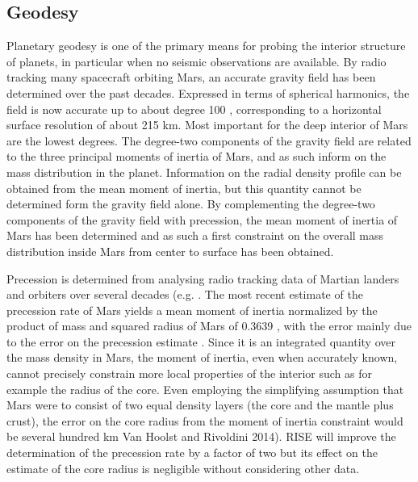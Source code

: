 \subsection{Geodesy}
Planetary geodesy is one of the primary means for probing the interior structure of planets, in particular when no seismic observations are available. By radio tracking many spacecraft orbiting Mars, an accurate gravity field has been determined over the past decades. Expressed in terms of spherical harmonics, the field is now accurate up to about degree 100 \citep{Konopliv2016, Genova2016}, corresponding to a horizontal surface resolution of about 215 km. Most important for the deep interior of Mars are the lowest degrees. The degree-two components of the gravity field are related to the three principal moments of inertia of Mars, and as such inform on the mass distribution in the planet. Information on the radial density profile can be obtained from the mean moment of inertia, but this quantity cannot be determined form the gravity field alone. By complementing the degree-two components of the gravity field with precession, the mean moment of inertia of Mars has been determined and as such a first constraint on the overall mass distribution inside Mars from center to surface has been obtained.

Precession is determined from analysing radio tracking data of Martian landers and orbiters over several decades (e.g. \citep{Konopliv2011, LeMaistre2013, Kuchynka2014, Konopliv2016}. The most recent estimate of the precession rate of Mars yields a mean moment of inertia normalized by the product of mass and squared radius of Mars of 0.3639 , with the error mainly due to the error on the precession estimate \citep{Konopliv2016}.  Since it is an integrated quantity over the mass density in Mars, the moment of inertia, even when accurately known, cannot precisely constrain more local properties of the interior such as for example the radius of the core. Even employing the simplifying assumption that Mars were to consist of two equal density layers (the core and the mantle plus crust), the error on the core radius from the moment of inertia constraint would be several hundred km Van Hoolst and Rivoldini 2014). RISE will improve the determination of the precession rate by a factor of two but its effect on the estimate of the core radius is negligible without considering other data.

